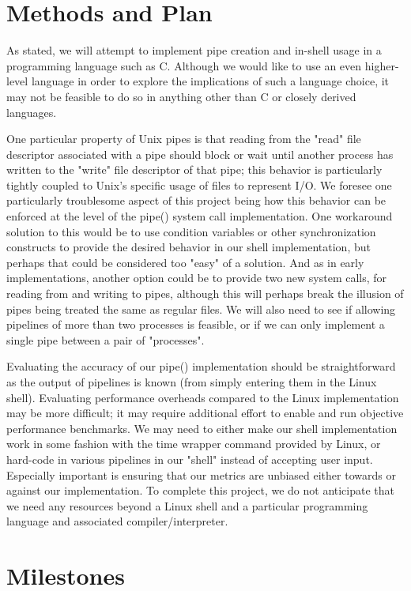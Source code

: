 \section{Methods and Plan}

As stated, we will attempt to implement pipe creation and in-shell usage in a programming language such as C. Although we would like to use an even higher-level language in order to explore the implications of such a language choice, it may not be feasible to do so in anything other than C or closely derived languages. 

One particular property of Unix pipes is that reading from the "read" file descriptor associated with a pipe should block or wait until another process has written to the "write" file descriptor of that pipe; this behavior is particularly tightly coupled to Unix's specific usage of files to represent I/O. We foresee one particularly troublesome aspect of this project being how this behavior can be enforced at the level of the pipe() system call implementation. One workaround solution to this would be to use condition variables or other synchronization constructs to provide the desired behavior in our shell implementation, but perhaps that could be considered too "easy" of a solution. And as in early implementations, another option could be to provide two new system calls, for reading from and writing to pipes, although this will perhaps break the illusion of pipes being treated the same as regular files. We will also need to see if allowing pipelines of more than two processes is feasible, or if we can only implement a single pipe between a pair of "processes".

Evaluating the accuracy of our pipe() implementation should be straightforward as the output of pipelines is known (from simply entering them in the Linux shell).  Evaluating performance overheads compared to the Linux implementation may be more difficult; it may require additional effort to enable and run objective performance benchmarks. We may need to either make our shell implementation work in some fashion with the time wrapper command provided by Linux, or hard-code in various pipelines in our "shell" instead of accepting user input. Especially important is ensuring that our metrics are unbiased either towards or against our implementation.  To complete this project, we do not anticipate that we need any resources beyond a Linux shell and a particular programming language and associated compiler/interpreter.

\section{Milestones}

